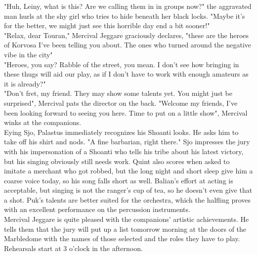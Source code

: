 "Huh, Leiny, what is this? Are we calling them in in groups now?" the aggravated man hurls at the shy girl who tries to hide beneath her black locks. "Maybe it's for the better, we might just see this horrible day end a bit sooner!"\\

"Relax, dear Touran," Mercival Jeggare graciously declares, "these are the heroes of Korvosa I've been telling you about. The ones who turned around the negative vibe in the city"\\

"Heroes, you say? Rabble of the street, you mean. I don't see how bringing in these thugs will aid our play, as if I don't have to work with enough amateurs as it is already?"\\

"Don't fret, my friend. They may show some talents yet. You might just be surprised", Mercival pats the director on the back. "Welcome my friends, I've been looking forward to seeing you here. Time to put on a little show", Mercival winks at the companions.\\

Eying Sjo, Palastus immediately recognizes his Shoanti looks. He asks him to take off his shirt and nods. "A fine barbarian, right there." Sjo impresses the jury with his impersonation of a Shoanti who tells his tribe about his latest victory, but his singing obviously still needs work. Quint also scores when asked to imitate a merchant who got robbed, but the long night and short sleep give him a coarse voice today, so his song falls short as well. Balian's effort at acting is acceptable, but singing is not the ranger's cup of tea, so he doesn't even give that a shot. Puk's talents are better suited for the orchestra, which the halfling proves with an excellent performance on the percussion instruments.\\

Mercival Jeggare is quite pleased with the companions' artistic achievements. He tells them that the jury will put up a list tomorrow morning at the doors of the Marbledome with the names of those selected and the roles they have to play. Rehearsals start at 3 o'clock in the afternoon.\\

